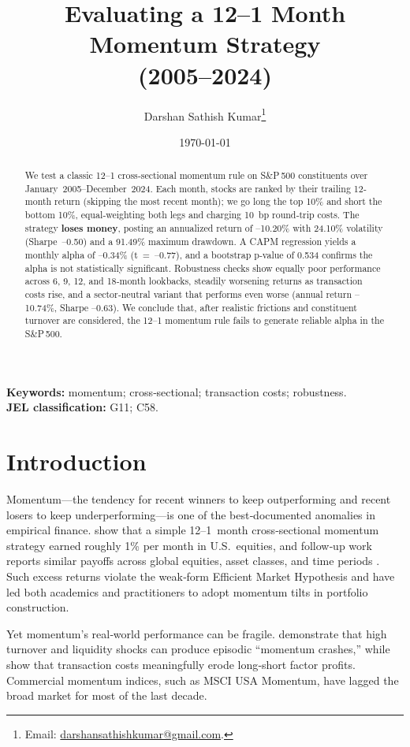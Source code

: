 \documentclass[11pt]{article}
\title{Evaluating a 12–1 Month Momentum Strategy \\ (2005–2024)}
\author{%
  Darshan Sathish Kumar\thanks{Email: \href{mailto:darshansathishkumar@gmail.com}{darshansathishkumar@gmail.com}.}%
}
\date{\today}
\begin{document}
\maketitle

\begin{abstract}
We test a classic 12--1 cross‐sectional momentum rule on S\&P\,500 constituents over January~2005--December~2024.  
Each month, stocks are ranked by their trailing 12‐month return (skipping the most recent month); we go long the top 10\% and short the bottom 10\%, equal‐weighting both legs and charging 10~bp round‐trip costs.  
The strategy \textbf{loses money}, posting an annualized return of --10.20\% with 24.10\% volatility (Sharpe~--0.50) and a 91.49\% maximum drawdown.  
A CAPM regression yields a monthly alpha of --0.34\% (t~=~--0.77), and a bootstrap p‐value of 0.534 confirms the alpha is not statistically significant.  
Robustness checks show equally poor performance across 6, 9, 12, and 18‐month lookbacks, steadily worsening returns as transaction costs rise, and a sector‐neutral variant that performs even worse (annual return --10.74\%, Sharpe --0.63).  
We conclude that, after realistic frictions and constituent turnover are considered, the 12--1 momentum rule fails to generate reliable alpha in the S\&P\,500.
\end{abstract}

\noindent\textbf{Keywords:} momentum; cross‑sectional; transaction costs; robustness.\\
\textbf{JEL classification:} G11; C58.

\section{Introduction}

Momentum—the tendency for recent winners to keep outperforming and recent losers to keep underperforming—is one of the best‑documented anomalies in empirical finance.  \citet{Jegadeesh1993} show that a simple 12--1 month cross‑sectional momentum strategy earned roughly 1\% per month in U.S.\ equities, and follow‑up work reports similar payoffs across global equities, asset classes, and time periods \citep[e.g.,][]{Asness2019}.  Such excess returns violate the weak‑form Efficient Market Hypothesis and have led both academics and practitioners to adopt momentum tilts in portfolio construction.

Yet momentum’s real‑world performance can be fragile.  \citet{Daniel2016} demonstrate that high turnover and liquidity shocks can produce episodic “momentum crashes,” while \citet{NovyMarx2016} show that transaction costs meaningfully erode long‑short factor profits.  Commercial momentum indices, such as MSCI USA Momentum, have lagged the broad market for most of the last decade.
\end{document}
